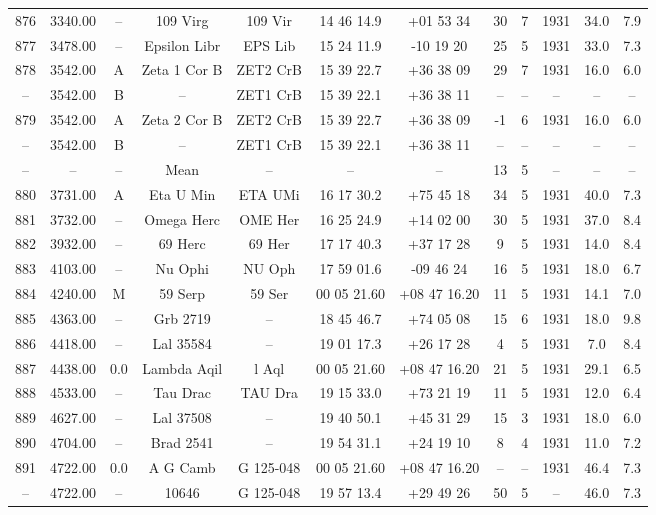 \begin{table}
\begin{tabular}{cccccccccccc}
876 & 3340.00 & -- & 109 Virg & 109 Vir & 14 46 14.9 & +01 53 34 & 30 & 7 & 1931 & 34.0 & 7.9 \\
877 & 3478.00 & -- & Epsilon Libr & EPS Lib & 15 24 11.9 & -10 19 20 & 25 & 5 & 1931 & 33.0 & 7.3 \\
878 & 3542.00 & A & Zeta 1 Cor B & ZET2 CrB & 15 39 22.7 & +36 38 09 & 29 & 7 & 1931 & 16.0 & 6.0 \\
-- & 3542.00 & B & -- & ZET1 CrB & 15 39 22.1 & +36 38 11 & -- & -- & -- & -- & -- \\
879 & 3542.00 & A & Zeta 2 Cor B & ZET2 CrB & 15 39 22.7 & +36 38 09 & -1 & 6 & 1931 & 16.0 & 6.0 \\
-- & 3542.00 & B & -- & ZET1 CrB & 15 39 22.1 & +36 38 11 & -- & -- & -- & -- & -- \\
-- & -- & -- & Mean & -- & -- & -- & 13 & 5 & -- & -- & -- \\
880 & 3731.00 & A & Eta U Min & ETA UMi & 16 17 30.2 & +75 45 18 & 34 & 5 & 1931 & 40.0 & 7.3 \\
881 & 3732.00 & -- & Omega Herc & OME Her & 16 25 24.9 & +14 02 00 & 30 & 5 & 1931 & 37.0 & 8.4 \\
882 & 3932.00 & -- & 69 Herc & 69 Her & 17 17 40.3 & +37 17 28 & 9 & 5 & 1931 & 14.0 & 8.4 \\
883 & 4103.00 & -- & Nu Ophi & NU Oph & 17 59 01.6 & -09 46 24 & 16 & 5 & 1931 & 18.0 & 6.7 \\
884 & 4240.00 & M & 59 Serp & 59 Ser & 00 05 21.60 & +08 47 16.20 & 11 & 5 & 1931 & 14.1 & 7.0 \\
885 & 4363.00 & -- & Grb 2719 & -- & 18 45 46.7 & +74 05 08 & 15 & 6 & 1931 & 18.0 & 9.8 \\
886 & 4418.00 & -- & Lal 35584 & -- & 19 01 17.3 & +26 17 28 & 4 & 5 & 1931 & 7.0 & 8.4 \\
887 & 4438.00 & 0.0 & Lambda Aqil & l Aql & 00 05 21.60 & +08 47 16.20 & 21 & 5 & 1931 & 29.1 & 6.5 \\
888 & 4533.00 & -- & Tau Drac & TAU Dra & 19 15 33.0 & +73 21 19 & 11 & 5 & 1931 & 12.0 & 6.4 \\
889 & 4627.00 & -- & Lal 37508 & -- & 19 40 50.1 & +45 31 29 & 15 & 3 & 1931 & 18.0 & 6.0 \\
890 & 4704.00 & -- & Brad 2541 & -- & 19 54 31.1 & +24 19 10 & 8 & 4 & 1931 & 11.0 & 7.2 \\
891 & 4722.00 & 0.0 & A G Camb & G 125-048 & 00 05 21.60 & +08 47 16.20 & -- & -- & 1931 & 46.4 & 7.3 \\
-- & 4722.00 & -- & 10646 & G 125-048 & 19 57 13.4 & +29 49 26 & 50 & 5 & -- & 46.0 & 7.3 \\

\end{tabular}
\end{table}
